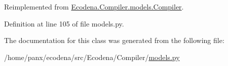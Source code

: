 Reimplemented from \hyperlink{class_ecodena_1_1_compiler_1_1models_1_1_compiler_a3de99c7aab62cbc96fbb1c83ba575cdd}{Ecodena.Compiler.models.Compiler}.



Definition at line 105 of file models.py.



The documentation for this class was generated from the following file:\begin{DoxyCompactItemize}
\item 
/home/panx/ecodena/src/Ecodena/Compiler/\hyperlink{_compiler_2models_8py}{models.py}\end{DoxyCompactItemize}
